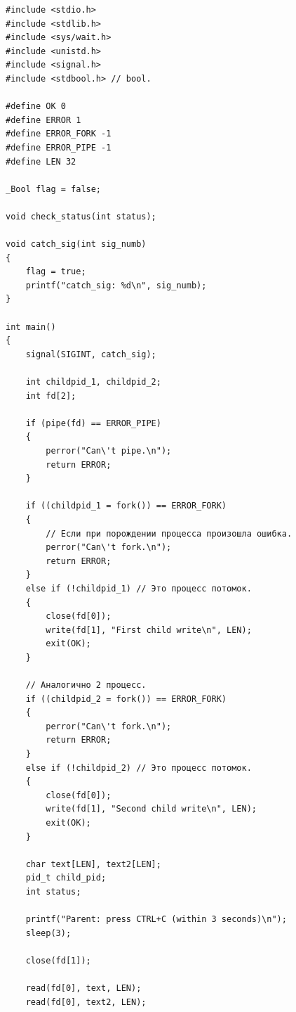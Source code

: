 \begin{figure}[ht!]
\end{figure}

\begin{lstlisting}[label=some-code,caption=Программа 5.]
#include <stdio.h>
#include <stdlib.h>
#include <sys/wait.h>
#include <unistd.h>
#include <signal.h>
#include <stdbool.h> // bool.

#define OK 0
#define ERROR 1
#define ERROR_FORK -1
#define ERROR_PIPE -1
#define LEN 32

_Bool flag = false;

void check_status(int status);

void catch_sig(int sig_numb)
{
	flag = true;
	printf("catch_sig: %d\n", sig_numb);
}

int main()
{
	signal(SIGINT, catch_sig);

	int childpid_1, childpid_2;
	int fd[2];

	if (pipe(fd) == ERROR_PIPE)
	{
		perror("Can\'t pipe.\n");
		return ERROR;
	}

	if ((childpid_1 = fork()) == ERROR_FORK)
	{
		// Если при порождении процесса произошла ошибка.
		perror("Can\'t fork.\n");
		return ERROR;
	}
	else if (!childpid_1) // Это процесс потомок.
	{
		close(fd[0]);
		write(fd[1], "First child write\n", LEN);
		exit(OK);
	}

	// Аналогично 2 процесс.
	if ((childpid_2 = fork()) == ERROR_FORK)
	{
		perror("Can\'t fork.\n");
		return ERROR;
	}
	else if (!childpid_2) // Это процесс потомок.
	{
		close(fd[0]);
		write(fd[1], "Second child write\n", LEN);
		exit(OK);
	}

	char text[LEN], text2[LEN];
	pid_t child_pid;
	int status;

	printf("Parent: press CTRL+C (within 3 seconds)\n");
	sleep(3);

	close(fd[1]);

	read(fd[0], text, LEN);
	read(fd[0], text2, LEN);


\end{lstlisting}
